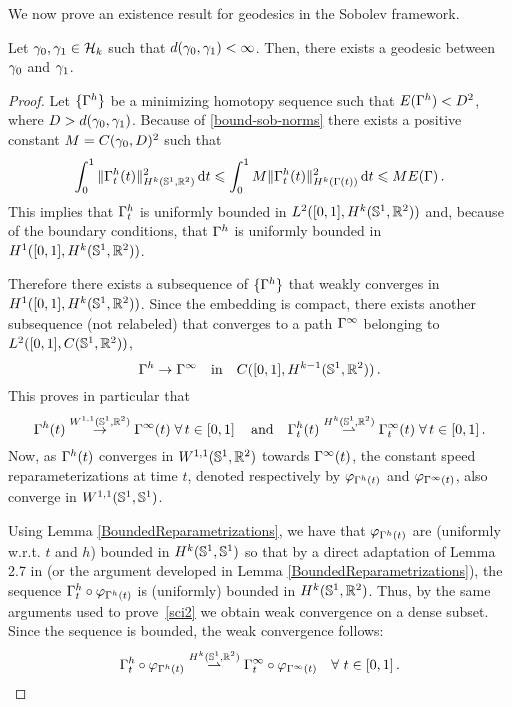 We now prove an existence result for geodesics in the Sobolev framework.




\begin{thm}[{\bf existence}]\label{existence_sobolev}
Let $\gamma_0, \gamma_1 \in \mathcal{H}_k$ such that $d(\gamma_0, \gamma_1)<\infty$.
Then, there exists a geodesic between $\gamma_0$ and $\gamma_1$.
\end{thm}


\begin{proof} 
Let $\{\Gamma^h\}$ be a minimizing homotopy sequence such that $E(\Gamma^h) < D^2$, where $D >d(\gamma_0,\gamma_1) $. 
Because of \eqref{bound-sob-norms} there exists a positive constant $M  = C(\gamma_0,D)^2$ such that  
\begin{equation}\label{lower-velocity0}
\int_0^1 \|\Gamma_t^h(t)\|^2_{H^k(\mathbb{S}^1,\mathbb{R}^2)}\,\mathrm{d} t\leqslant \int_0^1 M \|\Gamma_t^h(t)\|^2_{H^k(\Gamma(t))}\,\mathrm{d} t \leqslant  M E(\Gamma)\,.
\end{equation}
This implies  that  $\Gamma^h_t$ is uniformly bounded in  $L^2([0,1],H^k(\mathbb{S}^1,\mathbb{R}^2))$ and, because of the boundary conditions, that  $\Gamma^h$ is uniformly bounded in  $H^1([0,1],H^k(\mathbb{S}^1,{\mathbb R}^2))$. 

Therefore there exists a subsequence of $\{\Gamma^h\}$ that weakly converges in   $H^1([0,1],H^k(\mathbb{S}^1,{\mathbb R}^2))$.
Since the embedding 
is compact, there exists another subsequence (not relabeled)  that converges to a path $\Gamma^\infty$ belonging to $L^2([0,1], C(\mathbb{S}^1, {\mathbb R}^2))$,
$$\Gamma^h \rightarrow \Gamma^\infty \quad \mbox{in}\quad C([0,1],H^{k-1}(\mathbb{S}^1,{\mathbb R}^2))\,.$$
This proves in particular that 
$$ 
	\Gamma^h(t) \overset{W^{1,1}(\mathbb{S}^1, \mathbb{R}^2)}{\rightarrow} \Gamma^\infty(t) \; \forall \, t\in [0,1] \,
	\quad \text{and} \quad
 	\Gamma^h_t(t) \overset{H^k(\mathbb{S}^1, \mathbb{R}^2)}{\rightharpoonup} \Gamma^\infty_t(t) \; \forall \, t\in [0,1] \,.
$$
Now, as   $\Gamma^h(t)$ converges in $W^{1,1}(\mathbb{S}^1, \mathbb{R}^2)$ towards $\Gamma^\infty(t)$, the constant speed reparameterizations at time $t$, denoted respectively by  $\varphi_{\Gamma^h(t)}$ and $\varphi_{\Gamma^\infty(t)}$, also converge in $W^{1,1}(\mathbb{S}^1, \mathbb{S}^1)$.

Using Lemma \ref{BoundedReparametrizations}, we have that $\varphi_{\Gamma^h(t)}$ are (uniformly w.r.t. $t$ and $h$) bounded in $H^k(\mathbb{S}^1,\mathbb{S}^1)$ so that by a direct adaptation of Lemma 2.7 in \cite{Inci2013} (or the argument developed in Lemma \ref{BoundedReparametrizations}), the sequence $\Gamma_t^h \circ \varphi_{\Gamma^h(t)}$ is (uniformly) bounded in $H^k(\mathbb{S}^1,{\mathbb R}^2)$.
Thus, by the same arguments used to prove~\eqref{sci2} we obtain weak convergence on a dense subset. Since the sequence is bounded, the weak convergence follows: 
$$\Gamma^h_t\circ \varphi_{\Gamma^h(t)}\overset{H^k(\mathbb{S}^1,\mathbb{R}^2)}{\rightharpoonup}\Gamma^\infty_t\circ\varphi_{\Gamma^\infty(t)} \quad \forall \, \,t\in [0,1]\,.$$


\end{proof}
